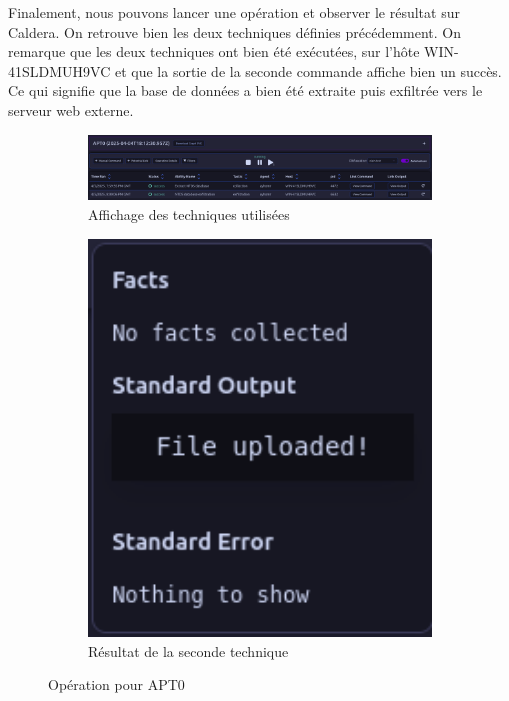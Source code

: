 \documentclass[12pt,letterpaper]{article}
\begin{document}
Finalement, nous pouvons lancer une opération et observer le résultat sur Caldera.
On retrouve bien les deux techniques définies précédemment.
On remarque que les deux techniques ont bien été exécutées, sur l'hôte WIN-41SLDMUH9VC et que la sortie de la seconde commande affiche bien un succès.
Ce qui signifie que la base de données a bien été extraite puis exfiltrée vers le serveur web externe.

\begin{figure}[h!]
    \centering
    \begin{subfigure}{0.95\textwidth}
        \centering
        \includegraphics[width=1\textwidth]{images/caldera/apt0_operation.png}
        \caption{Affichage des techniques utilisées}
        \label{fig:apt0_operation_1}
    \end{subfigure}
    \begin{subfigure}{0.3\textwidth}
        \centering
        \includegraphics[width=1\textwidth]{images/caldera/apt0_operation_result.png}
        \caption{Résultat de la seconde technique}
        \label{fig:apt0_operation_2}
    \end{subfigure}
    \caption{Opération pour APT0}
\end{figure}
\end{document}
